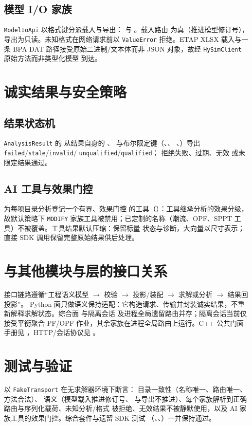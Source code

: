 \documentclass[UTF8,fontset=fandol,a4paper,11pt]{ctexart}
\begin{document}
\subsection{模型 I/O 家族}
\texttt{ModelIoApi} 以格式键分派载入与导出： 与
。载入路由  为真（推进模型修订号），
导出为只读。未知格式在网络请求前以 \texttt{ValueError} 拒绝。ETAP XLSX 载入与一条 BPA DAT
路径接受原始二进制/文本体而非 JSON 对象，故经 \texttt{HySimClient} 原始方法而非类型化模型
到达。

\section{诚实结果与安全策略}
\subsection{结果状态机}
\texttt{AnalysisResult} 的  从结果自身的 、
 与布尔限定键（、、
、）导出 \texttt{failed}/\texttt{stale}/\texttt{invalid}/
\texttt{unqualified}/\texttt{qualified}； 拒绝失败、过期、无效
或未限定结果通过。

\subsection{AI 工具与效果门控}
 为每项目录分析登记一个有界、效果门控
的工具（）：工具继承分析的效果分级，故默认策略下 \texttt{MODIFY}
家族工具被禁用；已定制的名称（潮流、OPF、SPPT 工具）不被覆盖。工具结果默认压缩：保留标量
状态与诊断，大向量以尺寸表示；直接 SDK 调用保留完整原始结果供后处理。

\section{与其他模块与层的接口关系}
接口链路遵循“工程语义模型 $\to$ 校验 $\to$ 投影/装配 $\to$ 求解或分析 $\to$ 结果回投影”。
Python 面只做语义保持适配：它构造请求、传输并封装诚实结果，不重新解释求解状态。综合面
与隔离会话  及进程全局遗留路由并存；隔离会话当前仅接受平衡聚合 PF/OPF
作业，其余家族在进程全局路由上运行。C++ 公共门面手册见
，HTTP/会话协议见 。

\section{测试与验证}
 以 \texttt{FakeTransport} 在无求解器环境下断言：
目录一致性（名称唯一、路由唯一、方法合法）、 语义（模型载入推进修订号、
 与导出不推进）、每个家族解析到正确路由与序列化载荷、未知分析/格式
被拒绝、无效结果不被静默使用，以及 AI 家族工具的效果门控。综合套件与遗留 SDK 测试
（、、）一并保持通过。
\end{document}
